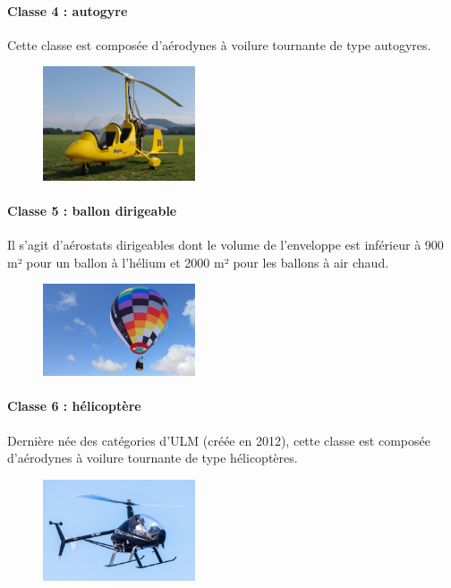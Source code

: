 	\paragraph{Classe 4 : autogyre}
	Cette classe est composée d'aérodynes à voilure tournante de type autogyres.

	\begin{figure}[H]
  	\centering
    \includegraphics[width=0.4\textwidth]{01-EtudeAeronefs/img/ULM_Classe_4.jpg}
	\end{figure}	
	
	\paragraph{Classe 5 : ballon dirigeable}
	Il s'agit d'aérostats dirigeables dont le volume de l'enveloppe est inférieur à 900 m² pour un  ballon à l'hélium et 2000 m² pour les ballons à air chaud.	
	
	\begin{figure}[H]
  	\centering
    \includegraphics[width=0.4\textwidth]{01-EtudeAeronefs/img/ULM_Classe_5.jpg}
	\end{figure}	
		
	\paragraph{Classe 6 : hélicoptère}	
	Dernière née des catégories d'ULM (créée en 2012), cette classe est composée d'aérodynes à voilure tournante de type hélicoptères.
	
	\begin{figure}[H]
  	\centering
    \includegraphics[width=0.4\textwidth]{01-EtudeAeronefs/img/ULM_Classe_6.jpg}
	\end{figure}


